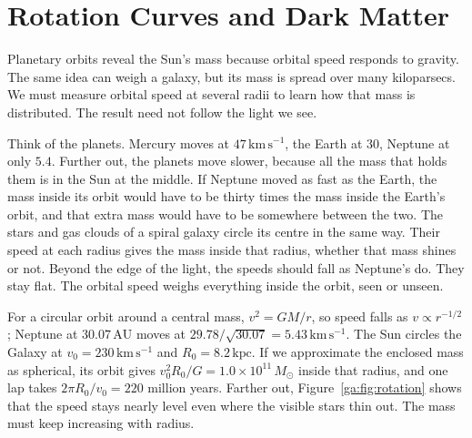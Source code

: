 \section{Rotation Curves and Dark Matter}
\label{ga:sec:rotation}

Planetary orbits reveal the Sun's mass because orbital speed responds to gravity. The same idea can weigh a galaxy, but its mass is spread over many kiloparsecs. We must measure orbital speed at several radii to learn how that mass is distributed. The result need not follow the light we see.

Think of the planets. Mercury moves at $47\,\mathrm{km\,s^{-1}}$, the Earth at $30$, Neptune at only $5.4$. Further out, the planets move slower, because all the mass that holds them is in the Sun at the middle. If Neptune moved as fast as the Earth, the mass inside its orbit would have to be thirty times the mass inside the Earth's orbit, and that extra mass would have to be somewhere between the two. The stars and gas clouds of a spiral galaxy circle its centre in the same way. Their speed at each radius gives the mass inside that radius, whether that mass shines or not. Beyond the edge of the light, the speeds should fall as Neptune's do. They stay flat. The orbital speed weighs everything inside the orbit, seen or unseen.

For a circular orbit around a central mass, $v^2=GM/r$, so speed falls as $v\propto r^{-1/2}$; Neptune at $30.07\,\mathrm{AU}$ moves at $29.78/\sqrt{30.07}=5.43\,\mathrm{km\,s^{-1}}$. The Sun circles the Galaxy at $v_0=230\,\mathrm{km\,s^{-1}}$ and $R_0=8.2\,\mathrm{kpc}$. If we approximate the enclosed mass as spherical, its orbit gives $v_0^2R_0/G=1.0\times10^{11}\,M_\odot$ inside that radius, and one lap takes $2\pi R_0/v_0=220$ million years. Farther out, Figure~\ref{ga:fig:rotation} shows that the speed stays nearly level even where the visible stars thin out. The mass must keep increasing with radius.


